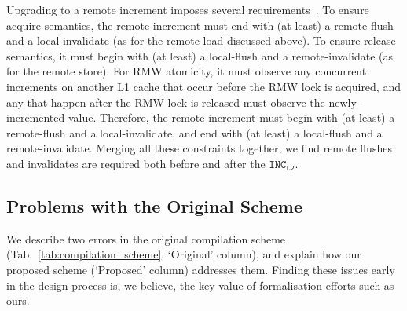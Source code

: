 \documentclass[svgnames,10pt]{sigplanconf}
\theoremstyle{definition}
\newcommand\INSincl[1]{\texttt{INC$_{\texttt{L#1}}$}}
\begin{document}
Upgrading to a remote increment imposes several
requirements~. To ensure acquire semantics, the remote
increment must end with (at least) a remote-flush and a
local-invalidate (as for the remote load discussed above). To ensure
release semantics, it must begin with (at least) a local-flush and a
remote-invalidate (as for the remote store). For RMW atomicity, it
must observe any concurrent increments on another L1 cache that occur
before the RMW lock is acquired, and any that happen after the RMW
lock is released must observe the newly-incremented value. Therefore,
the remote increment must begin with (at least) a remote-flush and a
local-invalidate, and end with (at least) a local-flush and a
remote-invalidate. Merging all these constraints together, we find
remote flushes and invalidates are required both before and after the
$\INSincl2$.

\subsection{Problems with the Original Scheme}
\label{sec:problems_compilation_scheme}

We describe two errors in the original compilation
scheme (Tab.~\ref{tab:compilation_scheme}, `Original' column), and
explain how our proposed scheme (`Proposed' column) addresses
them. Finding these issues early in the design process is, we
believe, the key value of formalisation efforts such as ours.
\end{document}
